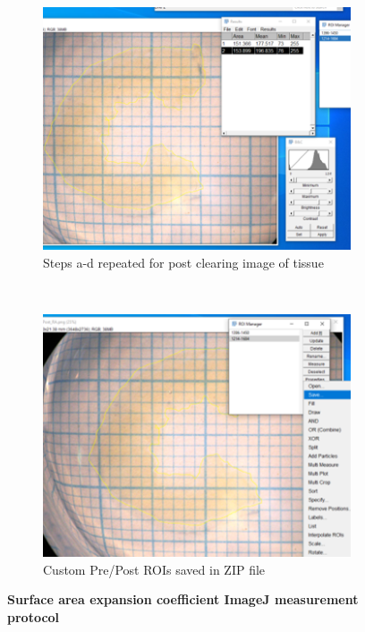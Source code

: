 \begin{figure}[H]
     \medskip
    \begin{subfigure}[t]{.475\textwidth}
    \centering
    \includegraphics[width=\linewidth]{Figures/MeasureProt5.png}
    \caption{Steps a-d repeated for post clearing image of tissue}
    \end{subfigure}\hfill
    ~
    \begin{subfigure}[t]{.475\textwidth}
    \centering
    \includegraphics[width=\linewidth]{Figures/MeasureProt6.png}
    \caption{Custom Pre/Post ROIs saved in ZIP file}
    \end{subfigure}\hfill
    
    \caption{\textbf{Surface area expansion coefficient ImageJ measurement protocol}}
    \label{fig:enter-label}
\end{figure}


